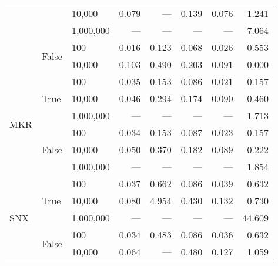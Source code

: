\begin{tabular}{lllrrrrr}
                          &                        & 10,000          & 0.079   & ---    & 0.139 & 0.076 & 1.241   \\
                          &                        & 1,000,000       & ---     & ---    & ---   & ---   & 7.064   \\
    \cline{2-8}
                          & \multirow{2}{*}{False} & 100             & 0.016   & 0.123  & 0.068 & 0.026 & 0.553   \\
                          &                        & 10,000          & 0.103   & 0.490  & 0.203 & 0.091 & 0.000   \\
    \cline{1-8}
    \cline{2-8}
    \multirow{6}{*}{MKR}  & \multirow{3}{*}{True}  & 100             & 0.035   & 0.153  & 0.086 & 0.021 & 0.157   \\
                          &                        & 10,000          & 0.046   & 0.294  & 0.174 & 0.090 & 0.460   \\
                          &                        & 1,000,000       & ---     & ---    & ---   & ---   & 1.713   \\
    \cline{2-8}
                          & \multirow{3}{*}{False} & 100             & 0.034   & 0.153  & 0.087 & 0.023 & 0.157   \\
                          &                        & 10,000          & 0.050   & 0.370  & 0.182 & 0.089 & 0.222   \\
                          &                        & 1,000,000       & ---     & ---    & ---   & ---   & 1.854   \\
    \cline{1-8}
    \cline{2-8}
    \multirow{5}{*}{SNX}  & \multirow{3}{*}{True}  & 100             & 0.037   & 0.662  & 0.086 & 0.039 & 0.632   \\
                          &                        & 10,000          & 0.080   & 4.954  & 0.430 & 0.132 & 0.730   \\
                          &                        & 1,000,000       & ---     & ---    & ---   & ---   & 44.609  \\
    \cline{2-8}
                          & \multirow{2}{*}{False} & 100             & 0.034   & 0.483  & 0.086 & 0.036 & 0.632   \\
                          &                        & 10,000          & 0.064   & ---    & 0.480 & 0.127 & 1.059   \\
    \bottomrule
\end{tabular}
